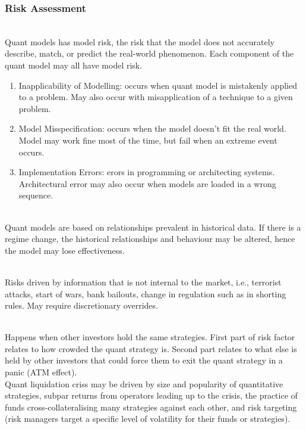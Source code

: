 \subsubsection{Risk Assessment}

\begin{definition} \\
Quant models has model risk, the risk that the model does not accurately describe, match, or predict the real-world phenomenon. Each component of the quant model may all have model risk.
\begin{enumerate}[label=\roman*.]
\setlength{\itemsep}{0pt}
\item Inapplicability of Modelling: occurs when quant model is mistakenly applied to a problem. May also occur with misapplication of a technique to a given problem.
\item Model Misspecification: occurs when the model doesn't fit the real world. Model may work fine most of the time, but fail when an extreme event occurs.
\item Implementation Errors: erors in programming or architecting systems. Architectural error may also occur when models are loaded in a wrong sequence.
\end{enumerate}
\end{definition}

\begin{definition} \\
Quant models are based on relationships prevalent in historical data. If there is a regime change, the historical relationships and behaviour may be altered, hence the model may lose effectiveness.
\end{definition}

\begin{definition} \\	
Risks driven by information that is not internal to the market, i.e., terrorist attacks, start of wars, bank bailouts, change in regulation such as in shorting rules. May require discretionary overrides.
\end{definition}

\begin{definition} \\
Happens when other investors hold the same strategies. First part of risk factor relates to how crowded the quant strategy is. Second part relates to what else is held by other investors that could force them to exit the quant strategy in a panic (ATM effect).\\
Quant liquidation criss may be driven by size and popularity of quantitative strategies, subpar returns from operators leading up to the crisis, the practice of funds cross-collateralising many strategies against each other, and risk targeting (risk managers target a specific level of volatility for their funds or strategies).
\end{definition}

